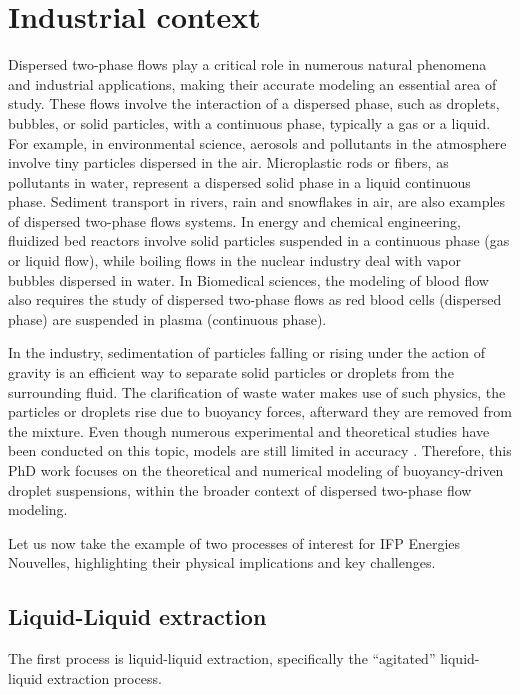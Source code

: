 \section{Industrial context}

Dispersed two-phase flows play a critical role in numerous natural phenomena and industrial applications, making their accurate modeling an essential area of study.
These flows involve the interaction of a dispersed phase, such as droplets, bubbles, or solid particles, with a continuous phase, typically a gas or a liquid. 
For example, in environmental science, aerosols and pollutants in the atmosphere involve tiny particles dispersed in the air. 
Microplastic rods or fibers, as pollutants in water, represent a dispersed solid phase in a liquid continuous phase. 
Sediment transport in rivers, rain and snowflakes in air, are also examples of dispersed two-phase flows systems. 
In energy and chemical engineering, fluidized bed reactors involve solid particles suspended in a continuous phase (gas or liquid flow),  while boiling flows in the nuclear industry deal with vapor bubbles dispersed in water. 
In Biomedical sciences, the modeling of blood flow also requires the study of dispersed two-phase flows as red blood cells (dispersed phase) are suspended in plasma (continuous phase). 

In the industry, sedimentation of particles falling or rising under the action of gravity is an efficient way to separate solid particles or droplets from the surrounding fluid. 
The clarification of waste water makes use of such physics, the particles or droplets rise due to buoyancy forces, afterward they are removed from the mixture.
Even though numerous experimental and theoretical studies have been conducted on this topic, models are still limited in accuracy
 \citep{paisant2014modelisation,gemello2018modelling}. 
Therefore, this PhD work focuses on the theoretical and numerical modeling of buoyancy-driven droplet suspensions,  within the broader context of dispersed two-phase flow modeling.  

Let us now take the example of two processes of interest for IFP Energies Nouvelles, highlighting their physical implications and key challenges.  


\subsection{Liquid-Liquid extraction}


The first process is liquid-liquid extraction, specifically the ``agitated'' liquid-liquid extraction process. 

